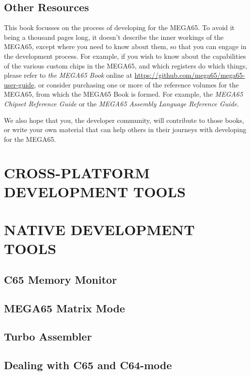 \chapter{Other Resources}

This book focusses on the process of developing for the MEGA65.  To
avoid it being a thousand pages long, it doesn't describe the inner
workings of the MEGA65, except where you need to know about them, so
that you can engage in the development process.  For example, if you
wish to know about the capabilities of the various custom chips in the
MEGA65, and which registers do which things, please refer to {\em the
MEGA65 Book} online
at \url{https://github.com/mega65/mega65-user-guide}, or consider
purchasing one or more of the reference volumes for the MEGA65, from
which the MEGA65 Book is formed.  For example, the {\em MEGA65 Chipset
Reference Guide} or the {\em MEGA65 Assembly Language Reference Guide}.

We also hope that you, the developer community, will contribute to
those books, or write your own material that can help others in their
journeys with developing for the MEGA65.

\part{CROSS-PLATFORM DEVELOPMENT TOOLS}








\part{NATIVE DEVELOPMENT TOOLS}

\chapter{C65 Memory Monitor}

\chapter{MEGA65 Matrix Mode}

\chapter{Turbo Assembler}

\chapter{Dealing with C65 and C64-mode}

